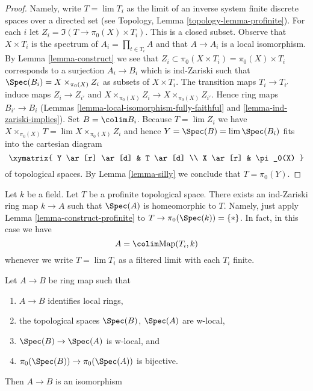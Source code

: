 \begin{proof}
Namely, write $T = \lim T_i$ as the limit of an inverse system finite
discrete spaces over a directed set (see
Topology, Lemma \ref{topology-lemma-profinite}). For each $i$ let
$Z_i = \Im(T \to \pi_0(X) \times T_i)$. This is a closed subset.
Observe that $X \times T_i$ is the spectrum of $A_i = \prod_{t \in T_i} A$
and that $A \to A_i$ is a local isomorphism. By Lemma \ref{lemma-construct}
we see that $Z_i \subset \pi_0(X \times T_i) = \pi_0(X) \times T_i$
corresponds to a surjection $A_i \to B_i$ which is ind-Zariski
such that $\Spec(B_i) = X \times_{\pi_0(X)} Z_i$ as subsets of
$X \times T_i$. The transition maps $T_i \to T_{i'}$ induce maps
$Z_i \to Z_{i'}$ and $X \times_{\pi_0(X)} Z_i \to X \times_{\pi_0(X)} Z_{i'}$.
Hence ring maps $B_{i'} \to B_i$
(Lemmas \ref{lemma-local-isomorphism-fully-faithful} and
\ref{lemma-ind-zariski-implies}).
Set $B = \colim B_i$. Because $T = \lim Z_i$ we have
$X \times_{\pi_0(X)} T = \lim  X \times_{\pi_0(X)} Z_i$
and hence $Y = \Spec(B) = \lim \Spec(B_i)$
fits into the cartesian diagram
$$
\xymatrix{
Y \ar[r] \ar[d] & T \ar[d] \\
X \ar[r] & \pi_0(X)
}
$$
of topological spaces. By Lemma \ref{lemma-silly}
we conclude that $T = \pi_0(Y)$.
\end{proof}

\begin{example}
\label{example-construct-space}
Let $k$ be a field. Let $T$ be a profinite topological space.
There exists an ind-Zariski ring map $k \to A$ such that
$\Spec(A)$ is homeomorphic to $T$. Namely, just apply
Lemma \ref{lemma-construct-profinite} to $T \to \pi_0(\Spec(k)) = \{*\}$.
In fact, in this case we have
$$
A = \colim \text{Map}(T_i, k)
$$
whenever we write $T = \lim T_i$ as a filtered limit with each $T_i$ finite.
\end{example}

\begin{lemma}
\label{lemma-w-local-morphism-equal-points-stalks-is-iso}
Let $A \to B$ be ring map such that
\begin{enumerate}
\item $A \to B$ identifies local rings,
\item the topological spaces $\Spec(B)$, $\Spec(A)$ are w-local,
\item $\Spec(B) \to \Spec(A)$ is w-local, and
\item $\pi_0(\Spec(B)) \to \pi_0(\Spec(A))$ is bijective.
\end{enumerate}
Then $A \to B$ is an isomorphism
\end{lemma}

